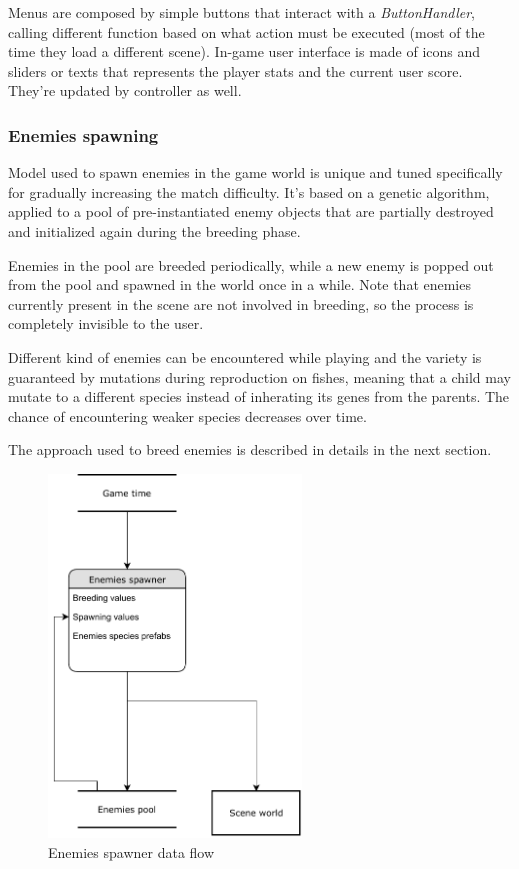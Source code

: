 \documentclass[11pt]{article}
\begin{document}
Menus are composed by simple buttons that interact with a \textit{ButtonHandler}, calling different function based on what action must be executed (most of the time they load a different scene).
In-game user interface is made of icons and sliders or texts that represents the player stats and the current user score. They're updated by controller as well.

\subsubsection{Enemies spawning}
Model used to spawn enemies in the game world is unique and tuned specifically for gradually increasing the match difficulty.
It's based on a genetic algorithm, applied to a pool of pre-instantiated enemy objects that are partially destroyed and initialized again during the breeding phase.

Enemies in the pool are breeded periodically, while a new enemy is popped out from the pool and spawned in the world once in a while. Note that enemies currently present in the scene are not involved in breeding, so the process is completely invisible to the user.

Different kind of enemies can be encountered while playing and the variety is guaranteed by mutations during reproduction on fishes, meaning that a child may mutate to a different species instead of inherating its genes from the parents. The chance of encountering weaker species decreases over time.

The approach used to breed enemies is described in details in the next section.

\begin{figure}[H]
  \centering
  \includegraphics[width=0.6\textwidth]{figures/enemies_spawner}
  \caption{Enemies spawner data flow}
\end{figure}
\end{document}
